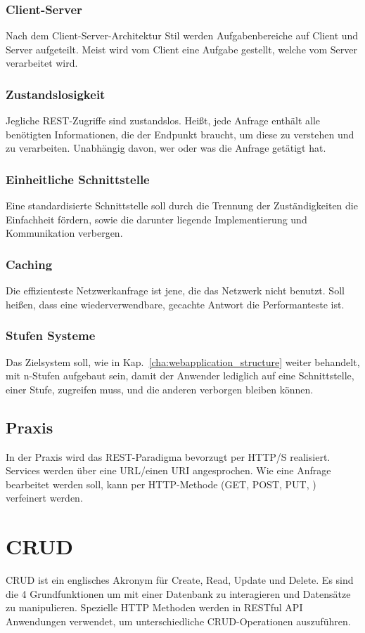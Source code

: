 \subsubsection{Client-Server}
Nach dem Client-Server-Architektur Stil werden Aufgabenbereiche auf Client und Server aufgeteilt. Meist wird vom Client eine Aufgabe gestellt, welche vom Server verarbeitet wird. 
\subsubsection{Zustandslosigkeit}
Jegliche REST-Zugriffe sind zustandslos. Heißt, jede Anfrage enthält alle benötigten Informationen, die der Endpunkt braucht, um diese zu verstehen und zu verarbeiten. Unabhängig davon, wer oder was die Anfrage getätigt hat.  
\subsubsection{Einheitliche Schnittstelle}
Eine standardisierte Schnittstelle soll durch die Trennung der Zuständigkeiten die Einfachheit fördern, sowie die darunter liegende Implementierung und Kommunikation verbergen. 
\subsubsection{Caching}
Die effizienteste Netzwerkanfrage ist jene, die das Netzwerk nicht benutzt.
Soll heißen, dass eine wiederverwendbare, gecachte Antwort die Performanteste ist. 
\subsubsection{Stufen Systeme}
Das Zielsystem soll, wie in Kap.~\ref{cha:webapplication_structure} weiter behandelt, mit n-Stufen aufgebaut sein, damit der Anwender lediglich auf eine Schnittstelle, einer Stufe, zugreifen muss, und die anderen verborgen bleiben können.

\subsection{Praxis}
In der Praxis wird das REST-Paradigma bevorzugt per HTTP/S realisiert. Services werden über eine URL/einen URI angesprochen. Wie eine Anfrage bearbeitet werden soll, kann per HTTP-Methode (GET, POST, PUT, \etc) verfeinert werden. 

\section{CRUD}
CRUD ist ein englisches Akronym für Create, Read, Update und Delete. Es sind die 4 Grundfunktionen um mit einer Datenbank zu interagieren und Datensätze zu manipulieren. Spezielle HTTP Methoden werden in RESTful API Anwendungen verwendet, um unterschiedliche CRUD-Operationen auszuführen.